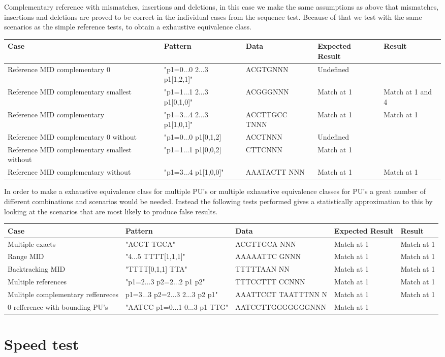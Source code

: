 \documentclass[12pt]{article}
\newcommand{\textapprox}{\raisebox{0.5ex}{\texttildelow}}
\newcommand{\pus}{PU's }
\begin{document}
Complementary reference with mismatches, insertions and deletions, in this case we make the same assumptions as above
that mismatches, insertions and deletions are proved to be correct in the individual cases from the sequence test.
Because of that we test with the same scenarios as the simple reference tests, to obtain a exhaustive equivalence class.
\begin{table}[H]
\begin{tabular}{p{4cm}|p{3cm}|p{2.5cm}|p{2.5cm}|p{2.5cm}}
Case 			& Pattern & Data & Expected Result & Result \\ \hline
Reference MID complementary 0 & "p1=0...0 2...3 \textapprox p1[1,2,1]" & ACGTGNNN & Undefined & \\ \hline
Reference MID complementary smallest & "p1=1...1 2...3 \textapprox p1[0,1,0]" & ACGGGNNN & Match at 1 & Match at 1 and 4 \\ \hline
Reference MID complementary & "p1=3...4 2...3 \textapprox p1[1,0,1]" & ACCTTGCC TNNN & Match at 1 & Match at 1 \\ \hline
Reference MID complementary 0 without & "p1=0...0 \textapprox p1[0,1,2] & ACCTNNN & Undefined & \\ \hline 
Reference MID complementary smallest without & "p1=1...1 \textapprox p1[0,0,2] & CTTCNNN & Match at 1 & \\ \hline
Reference MID complementary without & "p1=3...4 \textapprox p1[1,0,0]" & AAATACTT NNN & Match at 1 & Match at 1 \\ \hline
\end{tabular}
\end{table}


In order to make a exhaustive equivalence class for multiple \pus or multiple exhaustive equivalence classes for \pus
a great number of different combinations and scenarios would be needed. Instead the following tests performed gives a 
statistically approximation to this by looking at the scenarios that are most likely to produce false results.

\begin{table}[H]
\begin{tabular}{p{4cm}|p{3cm}|p{2.5cm}|p{2.5cm}|p{2.5cm}}
Case 			& Pattern & Data & Expected Result & Result \\ \hline
Multiple exacts 	& "ACGT TGCA" & ACGTTGCA NNN & Match at 1 & Match at 1\\ \hline
Range MID		& "4...5 TTTT[1,1,1]" & AAAAATTC GNNN & Match at 1 & Match at 1\\ \hline
Backtracking MID & "TTTT[0,1,1] TTA" & TTTTTAAN NN & Match at 1 & Match at 1\\ \hline
Multiple references & "p1=2...3 p2=2...2 p1 p2" & TTTCCTTT CCNNN & Match at 1 & Match at 1\\ \hline
Mulitple complementary reffenreces & p1=3...3 p2=2...3 2...3 \textapprox p2 \textapprox p1" & 
AAATTCCT TAATTTNN N & Match at 1 & Match at 1 \\ \hline
0 refference with bounding \pus & "AATCC p1=0...1 0...3 p1 TTG" & AATCCTTGGGGGGGNNN & Match at 1 & \\ \hline
\end{tabular}
\end{table} 
\section{Speed test}
\newpage
\printbibliography
\end{document}
